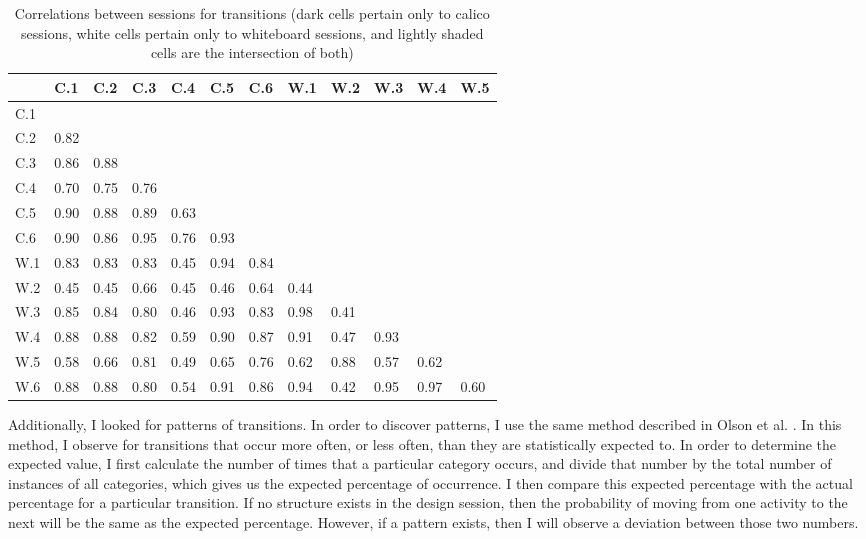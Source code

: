 \documentclass[12pt,fleqn]{ucithesis}
\begin{document}
\begin{table}
\centering
\caption{Correlations between sessions for transitions (dark cells pertain only to calico sessions, white cells pertain only to whiteboard sessions, and lightly shaded cells are the intersection of both)}
\begin{tabular}{ p{0.5cm}p{0.5cm}p{0.5cm}p{0.5cm}p{0.5cm}p{0.5cm}p{0.5cm}p{0.5cm}p{0.5cm}p{0.5cm}p{0.5cm}p{0.5cm}}
\toprule
&	C.1 &	C.2 &	C.3 &	C.4 &	C.5 &	C.6 &	W.1 &	W.2 &	W.3 &	W.4 &	W.5 \\
\midrule
C.1 	 & & & & & & & & & & & 								 \\
C.2 & 	0.82 & & & & & & & & & &								\\		
C.3 & 	0.86 &	0.88 & & & & & & & & & 							 \\		
C.4 & 	0.70 &	0.75 &	0.76 & & & & & & & &							\\	
C.5 & 	0.90 &	0.88 &	0.89 &	0.63 &	 & & & & & &						\\
C.6 & 	0.90 &	0.86 &	0.95 &	0.76 &	0.93 & & & & & &					\\	
W.1 &	0.83 &	0.83 &	0.83 &	0.45 &	0.94 &	0.84 & & & & &				\\	
W.2 &	0.45 &	0.45 &	0.66 &	0.45 &	0.46 &	0.64 &	0.44 & & & &				\\
W.3 &	0.85 &	0.84 &	0.80 &	0.46 &	0.93 &	0.83 &	0.98 &	0.41 & & &			\\
W.4 &	0.88 &	0.88 &	0.82 &	0.59 &	0.90 &	0.87 &	0.91 &	0.47 &	0.93 & &		\\
W.5 &	0.58 &	0.66 &	0.81 &	0.49 &	0.65 &	0.76 &	0.62 &	0.88 &	0.57 &	0.62 &		\\
W.6 &	0.88 &	0.88 &	0.80 &	0.54 &	0.91 &	0.86 &	0.94 &	0.42 &	0.95 &	0.97 &	0.60	\\
\bottomrule
\end{tabular}
\label{table:4}
\end{table}

Additionally, I looked for patterns of transitions. In order to discover patterns, I use the same method described in Olson et al. \citep{Olsona}. In this method, I observe for transitions that occur more often, or less often, than they are statistically expected to. In order to determine the expected value, I first calculate the number of times that a particular category occurs, and divide that number by the total number of instances of all categories, which gives us the expected percentage of occurrence. I then compare this expected percentage with the actual percentage for a particular transition. If no structure exists in the design session, then the probability of moving from one activity to the next will be the same as the expected percentage. However, if a pattern exists, then I will observe a deviation between those two numbers.
\end{document}
